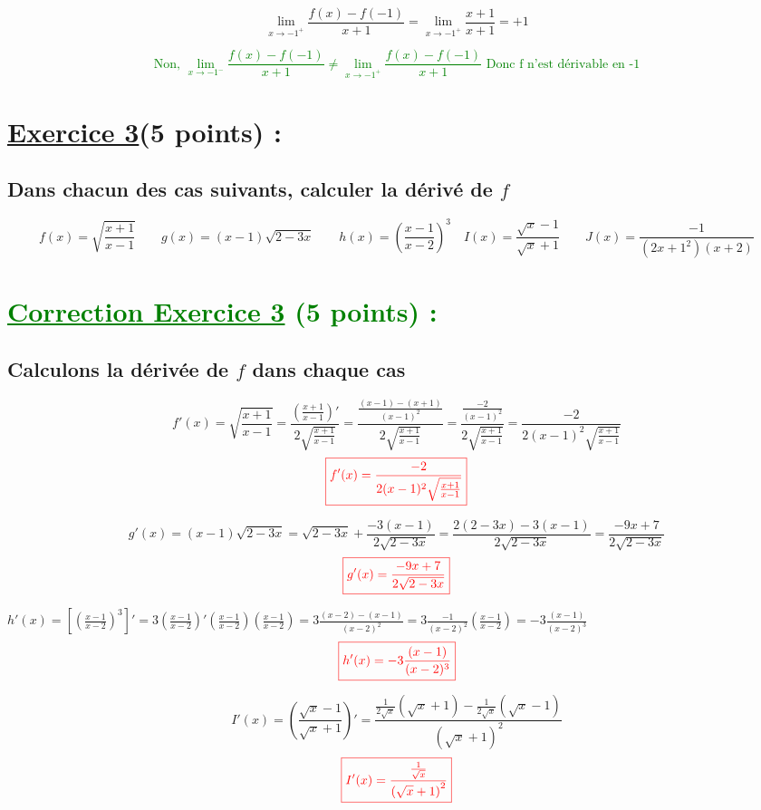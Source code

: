 \documentclass{article}
\begin{document}
\[\lim_{x \to -1^{+}}\frac{f(x)-f(-1)}{x+1}=\lim_{x \to -1^{+}}\frac{x+1}{x+1}=+1\]

\textcolor{green}{\[\text{Non, }\lim_{x \to -1^{-}}\frac{f(x)-f(-1)}{x+1}\neq\lim_{x \to -1^{+}}\frac{f(x)-f(-1)}{x+1}\text{ Donc f n'est dérivable en -1}\]}
\section*{\underline{Exercice 3}(5 points) :}
\subsection*{ Dans chacun des cas suivants, calculer la dérivé de $f$}
\[
f(x)=\sqrt{\frac{x+1}{x-1}}\quad\quad g(x)=(x-1)\sqrt{2-3x}\quad\quad h(x)=(\frac{x-1}{x-2})^{3}\quad I(x)=\frac{\sqrt{x}-1}{\sqrt{x}+1}\quad\quad J(x)=\frac{-1}{(2x+1^{2})(x+2)}
\]
\section*{\textcolor{green}{\underline{Correction Exercice 3} (5 points) :}}
\subsection*{ Calculons la dérivée de $f$ dans chaque cas}
\[
f'(x)=\sqrt{\frac{x+1}{x-1}}=\frac{(\frac{x+1}{x-1})'}{2\sqrt{\frac{x+1}{x-1}}}=\frac{\frac{(x-1)-(x+1)}{(x-1)^{2}}}{2\sqrt{\frac{x+1}{x-1}}}=\frac{\frac{-2}{(x-1)^{2}}}{2\sqrt{\frac{x+1}{x-1}}}=\frac{-2}{2(x-1)^{2}\sqrt{\frac{x+1}{x-1}}}
\]
\[\textcolor{red}{\boxed{f'(x)=\frac{-2}{2(x-1)^{2}\sqrt{\frac{x+1}{x-1}}}}}\]

\[g'(x)=(x-1)\sqrt{2-3x}=\sqrt{2-3x}+\frac{-3(x-1)}{2\sqrt{2-3x}}=\frac{2(2-3x)-3(x-1)}{2\sqrt{2-3x}}=\frac{-9x+7}{2\sqrt{2-3x}}\]
\[\textcolor{red}{\boxed{g'(x)=\frac{-9x+7}{2\sqrt{2-3x}}}}\]

$h'(x)=\left[ \left( \frac{x-1}{x-2}\right) ^{3}\right]'=3\left( \frac{x-1}{x-2}\right)'\left( \frac{x-1}{x-2}\right) \left( \frac{x-1}{x-2}\right) =3\frac{(x-2)-(x-1)}{(x-2)^{2}}=3\frac{-1}{(x-2)^{2}}(\frac{x-1}{x-2})=-3\frac{(x-1)}{(x-2)^{3}}$
\[\textcolor{red}{\boxed{h'(x)=-3\frac{(x-1)}{(x-2)^{3}}}}\]

\[I'(x)=\left( \frac{\sqrt{x}-1}{\sqrt{x}+1}\right)'=\frac{\frac{1}{2\sqrt{x}}\left( \sqrt{x}+1\right)-\frac{1}{2\sqrt{x}}\left( \sqrt{x}-1\right) }{\left( \sqrt{x}+1 \right)^{2}}\]
\[\textcolor{red}{\boxed{I'(x)=\frac{\frac{1}{\sqrt{x}}}{\left( \sqrt{x}+1 \right)^{2}}}}\]
\end{document}
